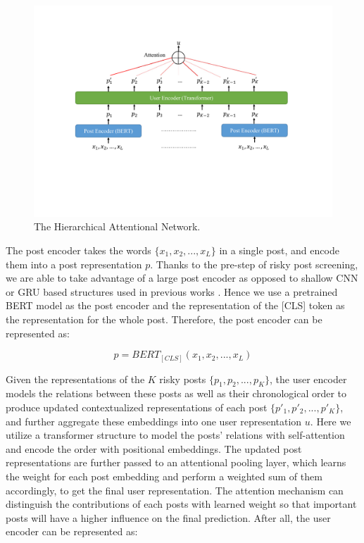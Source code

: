 \begin{figure}[h]
    \centering
    \includegraphics[width=\columnwidth]{figures/han.pdf}
    \caption{The Hierarchical Attentional Network.}
    \label{fig:han}
\end{figure}

The post encoder takes the words $\{x_1, x_2, ..., x_L\}$ in a single post, and encode them into a post representation $p$. Thanks to the pre-step of risky post screening, we are able to take advantage of a large post encoder as opposed to shallow CNN or GRU based structures used in previous works \citep{yates2017depression, zogan2021explainable}. Hence we use a pretrained BERT model as the post encoder and the representation of the [CLS] token as the representation for the whole post. Therefore, the post encoder can be represented as: 

\begin{equation}
    p = BERT_{[CLS]}(x_1, x_2, ..., x_L)
\end{equation}

Given the representations of the $K$ risky posts $\{p_1, p_2, ..., p_K\}$, the user encoder models the relations between these posts as well as their chronological order to produce updated contextualized representations of each post $\{p'_1, p'_2, ..., p'_K\}$, and further aggregate these embeddings into one user representation $u$. Here we utilize a transformer structure to model the posts' relations with self-attention and encode the order with positional embeddings. The updated post representations are further passed to an attentional pooling layer, which learns the weight for each post embedding and perform a weighted sum of them accordingly, to get the final user representation. The attention mechanism can distinguish the contributions of each posts with learned weight so that important posts will have a higher influence on the final prediction. After all, the user encoder can be represented as:

